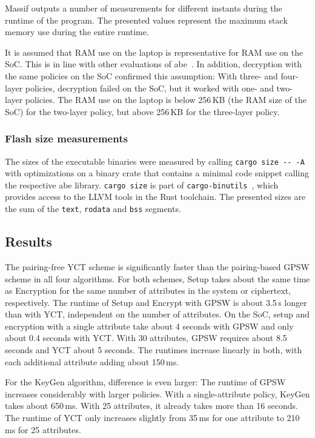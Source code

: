 Massif outputs a number of measurements for different instants during the runtime of the program. 
The presented values represent the maximum stack memory use during the entire runtime.

It is assumed that RAM use on the laptop is representative for RAM use on the SoC.
This is in line with other evaluations of \acrshort{abe}~\cite{borgh_attribute-based_2016}. 
In addition, decryption with the same policies on the SoC confirmed this assumption:
With three- and four-layer policies, decryption failed on the SoC, but it worked with one- and two-layer policies.
The RAM use on the laptop is below 256\,KB (the RAM size of the SoC) for the two-layer policy, but above 256\,KB for the three-layer policy.

\subsubsection{Flash size measurements}


The sizes of the executable binaries were measured by calling \verb+cargo size -- -A+ with optimizations on a binary crate that contains a minimal code snippet calling the respective \acrshort{abe} library.
\verb+cargo size+ is part of \verb+cargo-binutils+~\cite{noauthor_cargo-binutils_nodate}, which provides access to the LLVM tools in the Rust toolchain.
The presented sizes are the sum of the \texttt{text}, \texttt{rodata} and \texttt{bss} segments.


\subsection{Results}
The pairing-free YCT scheme is significantly faster than the pairing-based GPSW scheme in all four algorithms. 
For both schemes, Setup takes about the same time as Encryption for the same number of attributes in the system or ciphertext, respectively.
The runtime of Setup and Encrypt with GPSW is about 3.5\,s longer than with YCT, independent on the number of attributes.
On the SoC, setup and encryption with a single attribute take about 4 seconds with GPSW and only about 0.4 seconds with YCT.
With 30 attributes, GPSW requires about 8.5 seconds and YCT about 5 seconds.
The runtimes increase linearly in both, with each additional attribute adding about 150\,ms.

For the KeyGen algorithm, difference is even larger:
The runtime of GPSW increases considerably with larger policies.
With a single-attribute policy, KeyGen takes about 650\,ms. With 25 attributes, it already takes more than 16 seconds.
The runtime of YCT only increases slightly from 35\,ms for one attribute to 210\,ms for 25 attributes.

